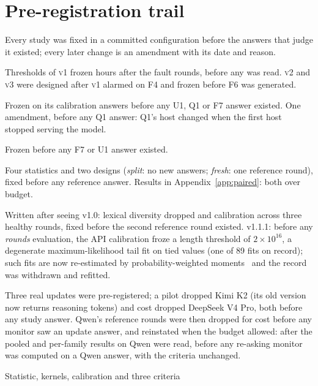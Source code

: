 \documentclass[11pt]{article}
\newcommand{\vone}{\textsc{v1}}
\newcommand{\vtwo}{\textsc{v2}}
\newcommand{\vthree}{\textsc{v3}}
\begin{document}
\section{Pre-registration trail}
\label{app:prereg}

Every study was fixed in a committed configuration before the answers that judge
it existed; every later change is an amendment with its date and reason.

\begin{description}[leftmargin=0pt,itemsep=2pt,font=\normalfont\itshape]
  \item[Local study.] Thresholds of \vone{} frozen hours after the fault rounds,
  before any was read. \vtwo{} and \vthree{} were designed after \vone{} alarmed on
  F4 and frozen before F6 was generated.
  \item[Hosted DeepSeek study.] Frozen on its calibration answers before any
  U1, Q1 or F7 answer existed. One amendment, before any Q1 answer: Q1's host
  changed when the first host stopped serving the model.
  \item[Real traffic.] Frozen before any F7 or U1 answer existed.
  \item[Paired monitor v1.0.] Four statistics and two designs (\emph{split}: no new
  answers; \emph{fresh}: one reference round), fixed before any reference answer.
  Results in Appendix~\ref{app:paired}: both over budget.
  \item[v1.1, \emph{rounds}.] Written after seeing v1.0: lexical diversity dropped
  and calibration across three healthy rounds, fixed before the second reference
  round existed. v1.1.1: before any \emph{rounds} evaluation, the API calibration
  froze a length threshold of $2\times10^{16}$, a degenerate maximum-likelihood tail
  fit on tied values (one of 89 fits on record); such fits are now re-estimated by
  probability-weighted moments~\citep{hosking1987pwm} and the record was withdrawn
  and refitted.
  \item[Update replication.] Three real updates were pre-registered; a pilot
  dropped Kimi K2 (its old version now returns reasoning tokens) and cost dropped
  DeepSeek V4 Pro, both before any study answer. Qwen's reference rounds were
  then dropped for cost before any monitor saw an update answer, and reinstated
  when the budget allowed: after the pooled and per-family results on Qwen were
  read, before any re-asking monitor was computed on a Qwen answer, with the
  criteria unchanged.
  \item[Served-answer test.] Statistic, kernels, calibration and three criteria

\end{description}
\end{document}
